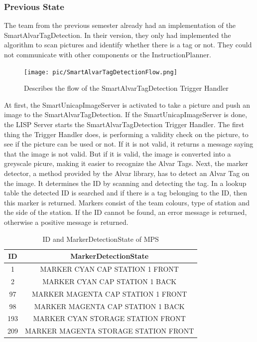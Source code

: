 \subsubsection{Previous State}

The team from the previous semester already had an implementation of the SmartAlvarTagDetection. In their version, they only had implemented the algorithm to scan pictures and identify whether there is a tag or not. They could not communicate with other components or the InstructionPlanner. \\

\begin{figure}[h]
\centering
\texttt{[image: pic/SmartAlvarTagDetectionFlow.png]}
\caption{Describes the flow of the SmartAlvarTagDetection Trigger Handler}
\label{fig:smartAlvarFlow}
\end{figure}


At first, the SmartUnicapImageServer is activated to take a picture and push an image to the SmartAlvarTagDetection. If the SmartUnicapImageServer is done, the LISP Server starts the SmartAlvarTagDetection Trigger Handler. The first thing the Trigger Handler does, is performing a validity check on the picture, to see if the picture can be used or not. If it is not valid, it returns a message saying that the image is not valid. But if it is valid, the image is converted into a greyscale picure, making it easier to recognize the Alvar Tags. Next, the marker detector, a method provided by the Alvar library, has to detect an Alvar Tag on the image. It determines the ID by scanning and detecting the tag. In a lookup table the detected ID is searched and if there is a tag belonging to the ID, then this marker is returned. Markers consist of the team colours, type of station and the side of the station. If the ID cannot be found, an error message is returned, otherwise a positive message is returned. \\

\begin {table}[h]
\caption{ID and MarkerDetectionState of MPS}
\label{tab:alvar_mps}
\begin{center}

 \begin{tabular}{|c | c|}
 \hline
 ID & MarkerDetectionState \\ [0.5ex] 
 \hline\hline
 1 & MARKER CYAN CAP STATION 1 FRONT \\ 
 \hline
 2 & MARKER CYAN CAP STATION 1 BACK \\
 \hline
 97 & MARKER MAGENTA CAP STATION 1 FRONT \\
 \hline
 98 & MARKER MAGENTA CAP STATION 1 BACK \\
 \hline
 193 & MARKER CYAN STORAGE STATION FRONT \\ [1ex] 
 \hline
 209 & MARKER MAGENTA STORAGE STATION FRONT \\ [1ex] 
 \hline
\end{tabular}
\end{center}
\end{table}

